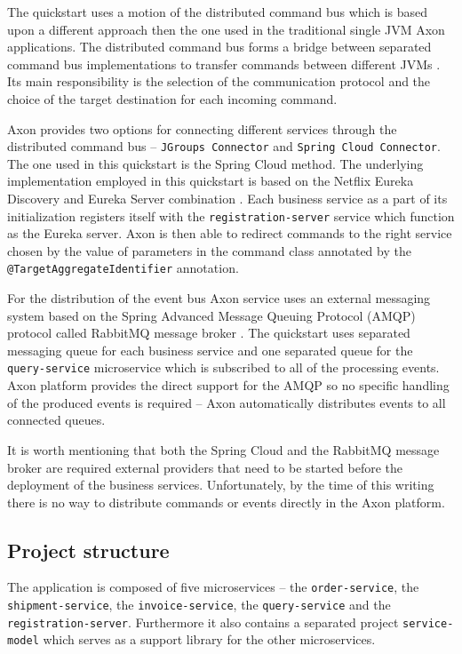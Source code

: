 \documentclass[oneside,
  digital, %
  table,   %
  nolof,     %
  nolot,     %
]{fithesis3}
\begin{document}
The quickstart uses a motion of the distributed command bus which is based upon a different approach then the one used in the traditional single JVM Axon applications. The distributed command bus forms a bridge between separated command bus implementations to transfer commands between different JVMs \cite{axon_framework_reference_guide}. Its main responsibility is the selection of the communication protocol and the choice of the target destination for each incoming command. 

Axon provides two options for connecting different services through the distributed command bus -- \texttt{JGroups Connector} and \texttt{Spring Cloud Connector}. The one used in this quickstart is the Spring Cloud method. The underlying implementation employed in this quickstart is based on the Netflix Eureka Discovery and Eureka Server combination \cite{service_registration}. Each business service as a part of its initialization registers itself with the  \texttt{registration-server} service which function as the Eureka server. Axon is then able to redirect commands to the right service chosen by the value of parameters in the command class annotated by the \texttt{@TargetAggregateIdentifier} annotation.

For the distribution of the event bus Axon service uses an external messaging system based on the Spring Advanced Message Queuing Protocol (AMQP) protocol called RabbitMQ message broker \cite{rabbitmq}. The quickstart uses separated messaging queue for each business service and one separated queue for the \texttt{query-service} microservice which is subscribed to all of the processing events. Axon platform provides the direct support for the AMQP so no specific handling of the produced events is required -- Axon automatically distributes events to all connected queues.

It is worth mentioning that both the Spring Cloud and the RabbitMQ message broker are required external providers that need to be started before the deployment of the business services. Unfortunately, by the time of this writing there is no way to distribute commands or events directly in the Axon platform.

\subsection{Project structure}

The application is composed of five microservices -- the  \texttt{order-service}, the \texttt{shipment-service}, the \texttt{invoice-service}, the \texttt{query-service} and the \texttt{registration-server}. Furthermore it also contains a separated project \texttt{service-model} which serves as a support library for the other microservices.
\end{document}
